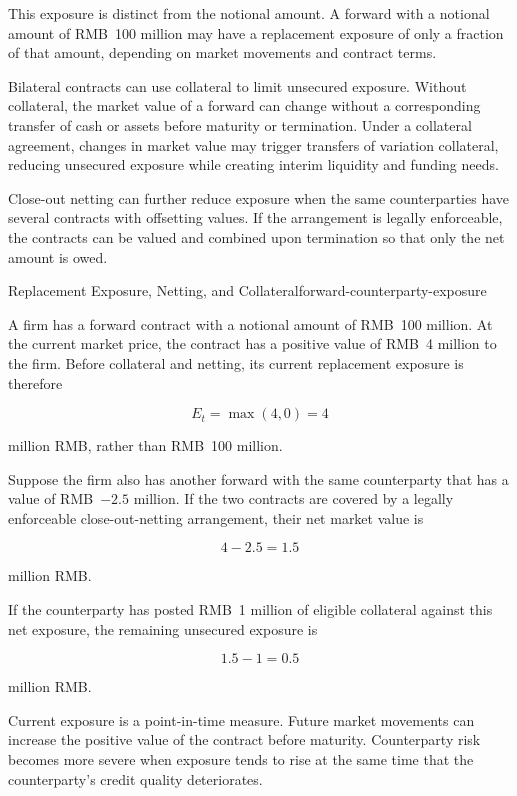 This exposure is distinct from the notional amount. A forward with a notional amount of RMB~100 million may have a replacement exposure of only a fraction of that amount, depending on market movements and contract terms.

Bilateral contracts can use collateral to limit unsecured exposure. Without collateral, the market value of a forward can change without a corresponding transfer of cash or assets before maturity or termination. Under a collateral agreement, changes in market value may trigger transfers of variation collateral, reducing unsecured exposure while creating interim liquidity and funding needs.

Close-out netting can further reduce exposure when the same counterparties have several contracts with offsetting values. If the arrangement is legally enforceable, the contracts can be valued and combined upon termination so that only the net amount is owed.

\begin{example}{Replacement Exposure, Netting, and Collateral}{forward-counterparty-exposure}

A firm has a forward contract with a notional amount of RMB~100 million. At the current market price, the contract has a positive value of RMB~4 million to the firm. Before collateral and netting, its current replacement exposure is therefore

\[
E_t=\max(4,0)=4
\]

million RMB, rather than RMB~100 million.

Suppose the firm also has another forward with the same counterparty that has a value of RMB~$-2.5$ million. If the two contracts are covered by a legally enforceable close-out-netting arrangement, their net market value is

\[
4-2.5=1.5
\]

million RMB.

If the counterparty has posted RMB~1 million of eligible collateral against this net exposure, the remaining unsecured exposure is

\[
1.5-1=0.5
\]

million RMB.

\end{example}

Current exposure is a point-in-time measure. Future market movements can increase the positive value of the contract before maturity. Counterparty risk becomes more severe when exposure tends to rise at the same time that the counterparty's credit quality deteriorates.


